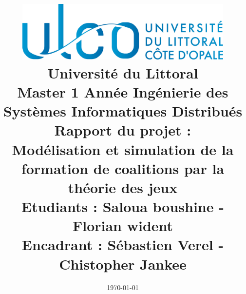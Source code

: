 \documentclass[30pt]{report}
\title{\includegraphics[width=12cm,height=30mm]{logo.jpg} \\ \vspace{15 mm} Université du Littoral \\ Master 1\up{ère} Année Ingénierie des Systèmes Informatiques Distribués \\ \vspace{15 mm} Rapport du projet : \\ Modélisation et simulation de la formation de coalitions par la théorie des jeux \\ \vspace{10 mm} Etudiants : Saloua boushine - Florian wident\\ Encadrant : Sébastien Verel - Chistopher Jankee }
\date{\today}
\begin{document}
\maketitle

\renewcommand{\contentsname}{Sommaire}
\tableofcontents
\end{document}
